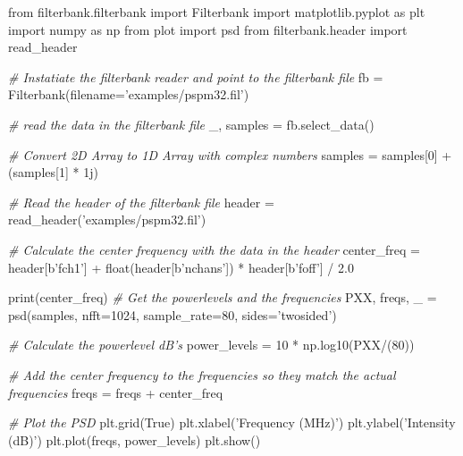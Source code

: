 \documentclass[]{article}
\newenvironment{Shaded}{}{}
\newcommand{\DecValTok}[1]{\textcolor[rgb]{0.25,0.63,0.44}{#1}}
\newcommand{\FloatTok}[1]{\textcolor[rgb]{0.25,0.63,0.44}{#1}}
\newcommand{\StringTok}[1]{\textcolor[rgb]{0.25,0.44,0.63}{#1}}
\newcommand{\ImportTok}[1]{#1}
\newcommand{\CommentTok}[1]{\textcolor[rgb]{0.38,0.63,0.69}{\textit{#1}}}
\newcommand{\VariableTok}[1]{\textcolor[rgb]{0.10,0.09,0.49}{#1}}
\newcommand{\OperatorTok}[1]{\textcolor[rgb]{0.40,0.40,0.40}{#1}}
\newcommand{\BuiltInTok}[1]{#1}
\newcommand{\NormalTok}[1]{#1}
\begin{document}
\begin{Shaded}
\begin{Highlighting}[]
\ImportTok{from}\NormalTok{ filterbank.filterbank }\ImportTok{import}\NormalTok{ Filterbank}
\ImportTok{import}\NormalTok{ matplotlib.pyplot }\ImportTok{as}\NormalTok{ plt}
\ImportTok{import}\NormalTok{ numpy }\ImportTok{as}\NormalTok{ np}
\ImportTok{from}\NormalTok{ plot }\ImportTok{import}\NormalTok{ psd}
\ImportTok{from}\NormalTok{ filterbank.header }\ImportTok{import}\NormalTok{ read_header}

\CommentTok{# Instatiate the filterbank reader and point to the filterbank file}
\NormalTok{fb }\OperatorTok{=}\NormalTok{ Filterbank(filename}\OperatorTok{=}\StringTok{'examples/pspm32.fil'}\NormalTok{)}

\CommentTok{# read the data in the filterbank file}
\NormalTok{_, samples }\OperatorTok{=}\NormalTok{ fb.select_data()}

\CommentTok{# Convert 2D Array to 1D Array with complex numbers}
\NormalTok{samples }\OperatorTok{=}\NormalTok{ samples[}\DecValTok{0}\NormalTok{] }\OperatorTok{+}\NormalTok{ (samples[}\DecValTok{1}\NormalTok{] }\OperatorTok{*}\NormalTok{ 1j)}

\CommentTok{# Read the header of the filterbank file}
\NormalTok{header }\OperatorTok{=}\NormalTok{ read_header(}\StringTok{'examples/pspm32.fil'}\NormalTok{)}

\CommentTok{# Calculate the center frequency with the data in the header}
\NormalTok{center_freq }\OperatorTok{=}\NormalTok{ header[b}\StringTok{'fch1'}\NormalTok{] }\OperatorTok{+} \BuiltInTok{float}\NormalTok{(header[b}\StringTok{'nchans'}\NormalTok{]) }\OperatorTok{*}\NormalTok{ header[b}\StringTok{'foff'}\NormalTok{] }\OperatorTok{/} \FloatTok{2.0}

\BuiltInTok{print}\NormalTok{(center_freq)}
\CommentTok{# Get the powerlevels and the frequencies}
\NormalTok{PXX, freqs, _ }\OperatorTok{=}\NormalTok{ psd(samples, nfft}\OperatorTok{=}\DecValTok{1024}\NormalTok{, sample_rate}\OperatorTok{=}\DecValTok{80}\NormalTok{, sides}\OperatorTok{=}\StringTok{'twosided'}\NormalTok{)}

\CommentTok{# Calculate the powerlevel dB's}
\NormalTok{power_levels }\OperatorTok{=}  \DecValTok{10} \OperatorTok{*}\NormalTok{ np.log10(PXX}\OperatorTok{/}\NormalTok{(}\DecValTok{80}\NormalTok{))}

\CommentTok{# Add the center frequency to the frequencies so they match the actual frequencies}
\NormalTok{freqs }\OperatorTok{=}\NormalTok{ freqs }\OperatorTok{+}\NormalTok{ center_freq}

\CommentTok{# Plot the PSD}
\NormalTok{plt.grid(}\VariableTok{True}\NormalTok{)}
\NormalTok{plt.xlabel(}\StringTok{'Frequency (MHz)'}\NormalTok{)}
\NormalTok{plt.ylabel(}\StringTok{'Intensity (dB)'}\NormalTok{)}
\NormalTok{plt.plot(freqs, power_levels)}
\NormalTok{plt.show()}
\end{Highlighting}
\end{Shaded}
\end{document}
